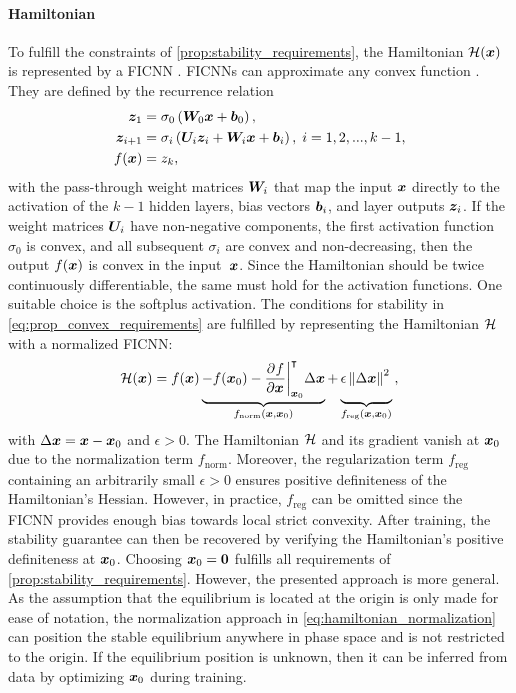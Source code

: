 \paragraph{Hamiltonian}
To fulfill the constraints of \cref{prop:stability_requirements}, the Hamiltonian ${\mathcal{H}}(\boldsymbol{x})$ is represented by a \gls{FICNN} \cite{amos2017}. \glspl{FICNN} can approximate any convex function \cite{chen2018a}. They are defined by the recurrence relation
\begin{equation}\label{eq:FICNN}\begin{aligned}
    \boldsymbol{z}_1 &= \sigma_0\left(\boldsymbol{W}_0\boldsymbol{x}+\boldsymbol{b}_0\right),\\
    \boldsymbol{z}_{i+1} &= \sigma_i\left(\boldsymbol{U}_i\boldsymbol{z}_i+\boldsymbol{W}_i\boldsymbol{x}+\boldsymbol{b}_i\right) ,\; i=1,2,...,k-1,\\
    f(\boldsymbol{x}) &= z_k,
\end{aligned}\end{equation}
with the pass-through weight matrices $\boldsymbol{W}_i$ that map the input $\boldsymbol{x}$ directly to the activation of the $k-1$ hidden layers, bias vectors $\boldsymbol{b}_i$, and layer outputs $\boldsymbol{z}_i$. 
If the weight matrices $\boldsymbol{U}_i$ have non-negative components, the first activation function $\sigma_0$ is convex, and all subsequent $\sigma_i$ are convex and non-decreasing, then the output $f(\boldsymbol{x})$ is convex in the input~$\boldsymbol{x}$. 
Since the Hamiltonian should be twice continuously differentiable, the same must hold for the activation functions. One suitable choice is the softplus activation.
The conditions for stability in \cref{eq:prop_convex_requirements} are fulfilled by representing the Hamiltonian ${\mathcal{H}}$ with a normalized \gls{FICNN}:
\begin{equation}\label{eq:hamiltonian_normalization}
    \hamiltonian(\bsx) = f(\bsx) \underbrace{- f(\bsx_0) - \partdiff{f}{\bsx}\bigg\vert_{\bsx_0}^{\intercal}\Delta\bsx}_{f_\text{norm}(\bsx,\bsx_0)} + \underbrace{\epsilon\norm{\Delta\bsx}^2\vphantom{\partdiff{f}{\bsx}\bigg\vert_{\bsx_0}}}_{f_\text{reg}(\bsx,\bsx_0)}\,,
\end{equation}
with $\Delta\boldsymbol{x}=\boldsymbol{x}-\boldsymbol{x}_0$ and $\epsilon>0$. The Hamiltonian ${\mathcal{H}}$ and its gradient vanish at $\boldsymbol{x}_0$ due to the normalization term $f_\text{norm}$. Moreover, the regularization term $f_\text{reg}$ containing an arbitrarily small $\epsilon>0$ ensures positive definiteness of the Hamiltonian's Hessian. 
However, in practice, $f_\text{reg}$ can be omitted since the \gls{FICNN} provides enough bias towards local strict convexity. After training, the stability guarantee can then be recovered by verifying the Hamiltonian's positive definiteness at $\boldsymbol{x}_0$. 
Choosing $\boldsymbol{x}_0=\boldsymbol{0}$ fulfills all requirements of \cref{prop:stability_requirements}. However, the presented approach is more general. As the assumption that the equilibrium is located at the origin is only made for ease of notation, the normalization approach in \cref{eq:hamiltonian_normalization} can position the stable equilibrium anywhere in phase space and is not restricted to the origin. If the equilibrium position is unknown, then it can be inferred from data by optimizing $\boldsymbol{x}_0$ during training.

